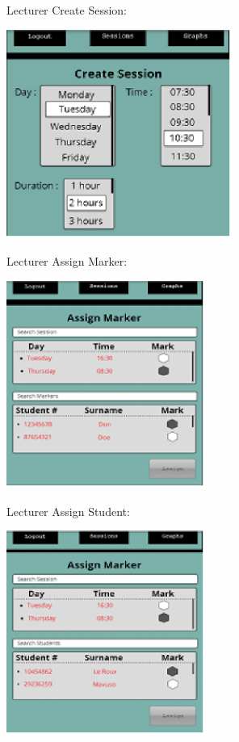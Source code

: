 \documentclass{article}
\begin{document}
Lecturer Create Session:

\includegraphics*[width=2.92in, height=2.70in, keepaspectratio=false]{image12}

Lecturer Assign Marker:

\includegraphics*[width=2.58in, height=2.68in, keepaspectratio=false]{image13}

\noindent 

Lecturer Assign Student:

\includegraphics*[width=2.57in, height=2.64in, keepaspectratio=false]{image14}

\noindent 
\end{document}
